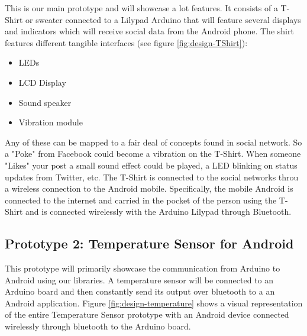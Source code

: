 This is our main prototype and will showcase a lot features.
It consists of a T-Shirt or sweater connected to a Lilypad Arduino that will feature
several displays and indicators which will receive social data from the Android phone.
The shirt features different tangible interfaces (see figure \ref{fig:design-TShirt}):
	
\begin{itemize}
	\item LEDs
	\item LCD Display
	\item Sound speaker
	\item Vibration module
\end{itemize}
	
Any of these can be mapped to a fair deal of concepts found in social network.
So a "Poke" from Facebook could become a vibration on the T-Shirt. When someone "Likes" your post a small sound effect
could be played, a LED blinking on status updates from Twitter, etc. The T-Shirt is connected to the social networks
throu a wireless connection to the Android mobile. Specifically, the mobile Android is connected to the internet
and carried in the pocket of the person using the T-Shirt and is connected wirelessly with the Arduino Lilypad through Bluetooth.
	


	
\subsection{Prototype 2: Temperature Sensor for Android}
This prototype will primarily showcase the communication from Arduino to Android using our libraries.
A temperature sensor will be connected to an Arduino board and then constantly send its output over bluetooth to a
an Android application. Figure \ref{fig:design-temperature} shows a visual representation of the entire Temperature Sensor
prototype with an Android device connected wirelessly through bluetooth to the Arduino board.

